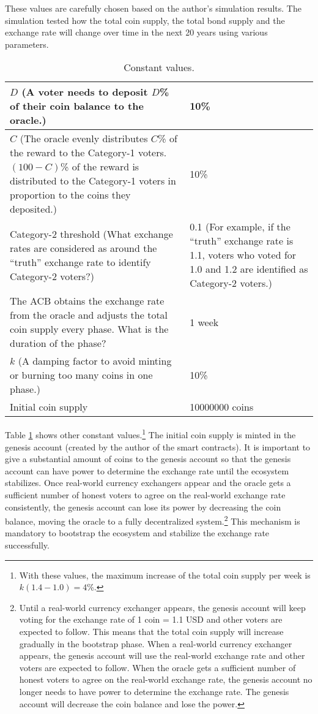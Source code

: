 \documentclass[dvipdfmx,a4paper]{article}
\begin{document}
These values are carefully chosen based on the author's simulation results. The simulation tested how the total coin supply, the total bond supply and the exchange rate will change over time in the next 20 years using various parameters.

\begin{table}[htb]
\begin{center}
\caption{Constant values.}\vspace{2ex}
\begin{tabular}{p{26em}|p{10em}}\hline
$D$ (A voter needs to deposit $D$\% of their coin balance to the oracle.) & 10\%\\\hline
$C$ (The oracle evenly distributes $C$\% of the reward to the Category-1 voters. $(100-C)$\% of the reward is distributed to the Category-1 voters in proportion to the coins they deposited.) & 10\%\\\hline
Category-2 threshold (What exchange rates are considered as around the ``truth'' exchange rate to identify Category-2 voters?) & 0.1 (For example, if the ``truth'' exchange rate is 1.1, voters who voted for 1.0 and 1.2 are identified as Category-2 voters.)\\\hline
The ACB obtains the exchange rate from the oracle and adjusts the total coin supply every phase. What is the duration of the phase? & 1 week\\\hline
$k$ (A damping factor to avoid minting or burning too many coins in one phase.) & 10\%\\\hline
Initial coin supply & 10000000 coins\\\hline
\end{tabular}
\label{table2}
\end{center}
\end{table}

Table \ref{table2} shows other constant values.\footnote{With these values, the maximum increase of the total coin supply per week is $k(1.4 - 1.0)=4$\%.} The initial coin supply is minted in the genesis account (created by the author of the smart contracts). It is important to give a substantial amount of coins to the genesis account so that the genesis account can have power to determine the exchange rate until the ecosystem stabilizes. Once real-world currency exchangers appear and the oracle gets a sufficient number of honest voters to agree on the real-world exchange rate consistently, the genesis account can lose its power by decreasing the coin balance, moving the oracle to a fully decentralized system.\footnote{Until a real-world currency exchanger appears, the genesis account will keep voting for the exchange rate of 1 coin = 1.1 USD and other voters are expected to follow. This means that the total coin supply will increase gradually in the bootstrap phase. When a real-world currency exchanger appears, the genesis account will use the real-world exchange rate and other voters are expected to follow. When the oracle gets a sufficient number of honest voters to agree on the real-world exchange rate, the genesis account no longer needs to have power to determine the exchange rate. The genesis account will decrease the coin balance and lose the power.} This mechanism is mandatory to bootstrap the ecosystem and stabilize the exchange rate successfully.
\end{document}
